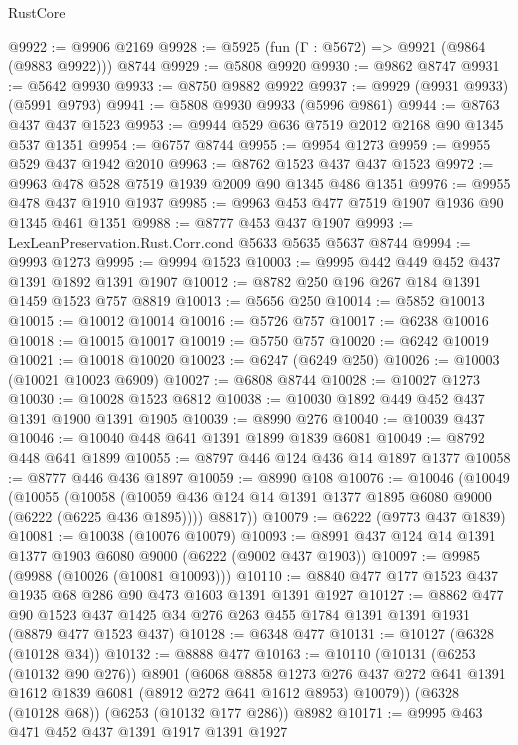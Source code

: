 \begin{lexlean}{RustCore}
\begin{coremodule}
@9922 := @9906 @2169
@9928 := @5925 (fun (Γ : @5672) => @9921 (@9864 (@9883 @9922))) @8744
@9929 := @5808 @9920
@9930 := @9862 @8747
@9931 := @5642 @9930
@9933 := @8750 @9882 @9922
@9937 := @9929 (@9931 @9933) (@5991 @9793)
@9941 := @5808 @9930 @9933 (@5996 @9861)
@9944 := @8763 @437 @437 @1523
@9953 := @9944 @529 @636 @7519 @2012 @2168 @90 @1345 @537 @1351
@9954 := @6757 @8744
@9955 := @9954 @1273
@9959 := @9955 @529 @437 @1942 @2010
@9963 := @8762 @1523 @437 @437 @1523
@9972 := @9963 @478 @528 @7519 @1939 @2009 @90 @1345 @486 @1351
@9976 := @9955 @478 @437 @1910 @1937
@9985 := @9963 @453 @477 @7519 @1907 @1936 @90 @1345 @461 @1351
@9988 := @8777 @453 @437 @1907
@9993 := LexLeanPreservation.Rust.Corr.cond @5633 @5635 @5637 @8744
@9994 := @9993 @1273
@9995 := @9994 @1523
@10003 := @9995 @442 @449 @452 @437 @1391 @1892 @1391 @1907
@10012 := @8782 @250 @196 @267 @184 @1391 @1459 @1523 @757 @8819
@10013 := @5656 @250
@10014 := @5852 @10013
@10015 := @10012 @10014
@10016 := @5726 @757
@10017 := @6238 @10016
@10018 := @10015 @10017
@10019 := @5750 @757
@10020 := @6242 @10019
@10021 := @10018 @10020
@10023 := @6247 (@6249 @250)
@10026 := @10003 (@10021 @10023 @6909)
@10027 := @6808 @8744
@10028 := @10027 @1273
@10030 := @10028 @1523 @6812
@10038 := @10030 @1892 @449 @452 @437 @1391 @1900 @1391 @1905
@10039 := @8990 @276
@10040 := @10039 @437
@10046 := @10040 @448 @641 @1391 @1899 @1839 @6081
@10049 := @8792 @448 @641 @1899
@10055 := @8797 @446 @124 @436 @14 @1897 @1377
@10058 := @8777 @446 @436 @1897
@10059 := @8990 @108
@10076 := @10046
    (@10049
      (@10055
        (@10058 (@10059 @436 @124 @14 @1391 @1377 @1895 @6080 @9000 (@6222 (@6225 @436 @1895))))
        @8817))
@10079 := @6222 (@9773 @437 @1839)
@10081 := @10038 (@10076 @10079)
@10093 := @8991 @437 @124 @14 @1391 @1377 @1903 @6080 @9000 (@6222 (@9002 @437 @1903))
@10097 := @9985 (@9988 (@10026 (@10081 @10093)))
@10110 := @8840 @477 @177 @1523 @437 @1935 @68 @286 @90 @473 @1603 @1391 @1391 @1927
@10127 := @8862
    @477
    @90
    @1523
    @437
    @1425
    @34
    @276
    @263
    @455
    @1784
    @1391
    @1391
    @1931
    (@8879 @477 @1523 @437)
@10128 := @6348 @477
@10131 := @10127 (@6328 (@10128 @34))
@10132 := @8888 @477
@10163 := @10110
    (@10131
      (@6253 (@10132 @90 @276))
      @8901
      (@6068
        @8858
        @1273
        @276
        @437
        @272
        @641
        @1391
        @1612
        @1839
        @6081
        (@8912 @272 @641 @1612 @8953)
        @10079))
    (@6328 (@10128 @68))
    (@6253 (@10132 @177 @286))
    @8982
@10171 := @9995 @463 @471 @452 @437 @1391 @1917 @1391 @1927

\end{coremodule}
\end{lexlean}
